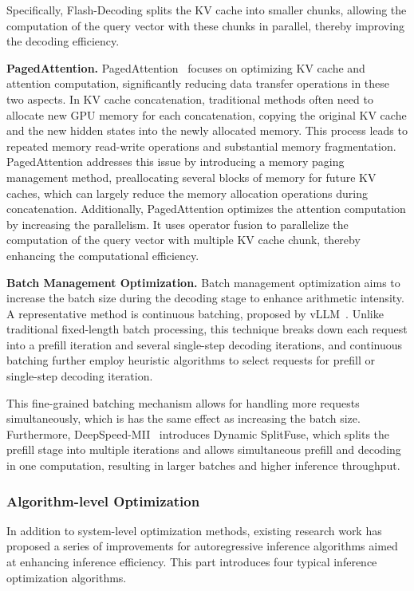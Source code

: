Specifically, Flash-Decoding splits the KV cache into smaller chunks, {allowing the computation of the query vector with these chunks in parallel}, thereby improving the decoding efficiency.

\textbf{PagedAttention.}
PagedAttention~\cite{vllm-pagedattention} focuses on optimizing {KV cache} and attention computation, significantly reducing data transfer operations in these two aspects. In KV cache concatenation, traditional methods often need to allocate new GPU memory for each concatenation, copying the original KV cache and the new hidden states into the newly allocated memory. This process leads to repeated memory read-write operations and substantial memory fragmentation. PagedAttention addresses this issue by introducing a memory paging management method, preallocating several blocks of memory for future KV caches, which can largely reduce the memory allocation operations during concatenation. Additionally, PagedAttention optimizes the attention computation by increasing the parallelism. It uses operator fusion to parallelize the {computation of the query vector with multiple KV cache chunk}, thereby enhancing the computational efficiency.

\textbf{Batch Management Optimization.} Batch management optimization aims to increase the batch size  during the decoding stage to enhance arithmetic intensity. A representative method is continuous batching, proposed by vLLM~\cite{vllm-pagedattention}. Unlike traditional fixed-length batch processing, this technique breaks down each request into a prefill iteration and several single-step {decoding iterations}, and continuous batching further employ heuristic algorithms to select requests for prefill or single-step decoding iteration. 

This fine-grained batching mechanism allows for handling more requests simultaneously, which is has the same effect as increasing the batch size. Furthermore, DeepSpeed-MII~\cite{Holmes-arxiv-2024-deepspeed} introduces Dynamic SplitFuse, which splits the prefill stage into multiple iterations and allows simultaneous prefill and decoding in one computation, resulting in larger batches and higher inference throughput.

\subsubsection{Algorithm-level Optimization}

In addition to system-level optimization methods, existing research work has proposed a series of improvements for autoregressive inference algorithms aimed at enhancing inference efficiency. This part introduces four typical inference optimization algorithms.

